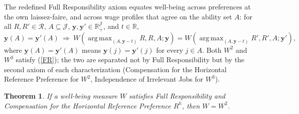 \documentclass[12pt,thmsb]{article}
\DeclareMathOperator*{\argmax}{arg\,max}
\newtheorem{theorem}{Theorem}
\begin{document}
The redefined Full Responsibility axiom equates well-being across preferences at
the own laissez-faire, and across wage profiles that agree on the ability set
$A$: for all $R,R'\in\mathcal R$, $A\subseteq\mathcal J$,
$\mathbf y,\mathbf y'\in\mathbb R_+^{\mathcal J}$, and $t\in\mathbb R$,
\begin{equation}
\mathbf y(A)=\mathbf y'(A)\ \Rightarrow\
W(\argmax_{(A,\mathbf y-t)}R,R,A;\mathbf y)
=W(\argmax_{(A,\mathbf y-t)}R',R',A;\mathbf y'),
\label{FR}
\end{equation}
where $\mathbf y(A)=\mathbf y'(A)$ means $\mathbf y(j)=\mathbf y'(j)$ for every
$j\in A$. Both $W^2$ and $W^3$ satisfy (\ref{FR}); the two are separated not by
Full Responsibility but by the second axiom of each characterization
(Compensation for the Horizontal Reference Preference for $W^2$, Independence of
Irrelevant Jobs for $W^3$).

\begin{theorem}
\label{thm:w2}
If a well-being measure $W$ satisfies Full Responsibility and Compensation for
the Horizontal Reference Preference $R^h$, then $W=W^2$.
\end{theorem}
\end{document}
